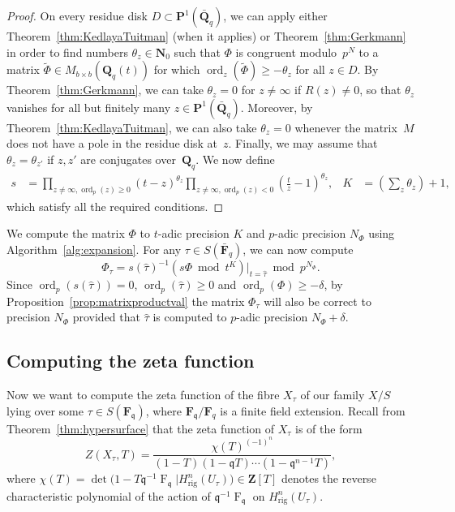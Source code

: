 \documentclass[a4paper,11pt]{article}
\numberwithin{equation}{section}
\newcommand{\NN}{\mathbf{N}} %
\newcommand{\ZZ}{\mathbf{Z}} %
\newcommand{\QQ}{\mathbf{Q}} %
\newcommand{\FF}{\mathbf{F}} %
\DeclareMathOperator{\ord}{ord}          %
\DeclareMathOperator{\Frob}{F}           %
\providecommand{\Hrig}{H_{\text{rig}}}  %
\theoremstyle{definition}
\begin{document}
\begin{proof}
On every residue disk $D \subset \mathbf{P}^1(\bar{\QQ}_q)$, we can 
apply either Theorem~\ref{thm:KedlayaTuitman} (when it applies) or 
Theorem~\ref{thm:Gerkmann} in order to find numbers $\theta_z \in \NN_0$ 
such that $\Phi$ is congruent modulo~$p^N$ to a matrix 
$\tilde{\Phi}\in M_{b \times b}(\QQ_q(t))$ for which $\ord_z(\tilde{\Phi}) \geq -\theta_z$ 
for all $z \in D$. 
By Theorem~\ref{thm:Gerkmann}, we can take $\theta_z=0$ for $z \neq \infty$ if 
$R(z) \neq 0$, so that $\theta_z$ vanishes for all but finitely many $z \in \mathbf{P}^1(\bar{\QQ}_q)$.
Moreover, by Theorem~\ref{thm:KedlayaTuitman}, we can also take $\theta_z=0$ 
whenever the matrix~$M$ does not have a pole in the residue disk at~$z$. 
Finally, we may assume that $\theta_z=\theta_{z'}$ if $z,z'$ are conjugates over~$\QQ_q$.
We now define
\begin{align*}
s &= \prod_{z \neq \infty, \ord_p(z) \geq 0} (t-z)^{\theta_z}
     \prod_{z \neq \infty, \ord_p(z) < 0}\left(\frac{t}{z}-1\right)^{\theta_z}, 
&K&= \left(\sum_{z} \theta_z \right) +1,
\end{align*}
which satisfy all the required conditions.
\end{proof}

We compute the matrix $\Phi$ to $t$-adic precision $K$ and $p$-adic
precision $N_{\Phi}$ using Algorithm~\ref{alg:expansion}. For any 
$\tau \in S(\bar{\FF}_q)$, we can now compute
\begin{equation*}
\Phi_{\tau} = 
  s(\hat{\tau})^{-1} \left( s \Phi \bmod{t^{K}} \right)|_{t=\hat{\tau}} 
  \bmod{p^{N_{\Phi}}}.
\end{equation*}
Since $\ord_p(s(\hat{\tau}))=0$, $\ord_p(\hat{\tau}) \geq 0$ and
$\ord_p(\Phi) \geq -\delta$, by Proposition~\ref{prop:matrixproductval} 
the matrix $\Phi_{\tau}$ will also be correct to precision $N_{\Phi}$ 
provided that $\hat{\tau}$ is computed to $p$-adic precision $N_{\Phi}+\delta$.

\subsection{Computing the zeta function}

Now we want to compute the zeta function of the fibre $X_{\tau}$ of
our family $X/S$ lying over some $\tau \in S(\FF_{\mathfrak{q}})$, 
where $\FF_{\mathfrak{q}}/\FF_q$ is a finite field extension.  
Recall from Theorem~\ref{thm:hypersurface} 
that the zeta function of $X_{\tau}$ is of the form
\begin{equation*}
Z(X_{\tau},T) = \frac{\chi(T)^{(-1)^n}}{(1 - T) (1 - \mathfrak{q}T) \dotsm (1 - \mathfrak{q}^{n-1}T)},
\end{equation*}
where $\chi(T) = \det \bigl( 1 - T \mathfrak{q}^{-1} \Frob_{\mathfrak{q}} | \Hrig^n(U_{\tau}) \bigr) \in \ZZ[T]$ 
denotes the reverse characteristic polynomial of the action 
of $\mathfrak{q}^{-1} \Frob_{\mathfrak{q}}$ 
on $\Hrig^n(U_{\tau})$.
\end{document}
